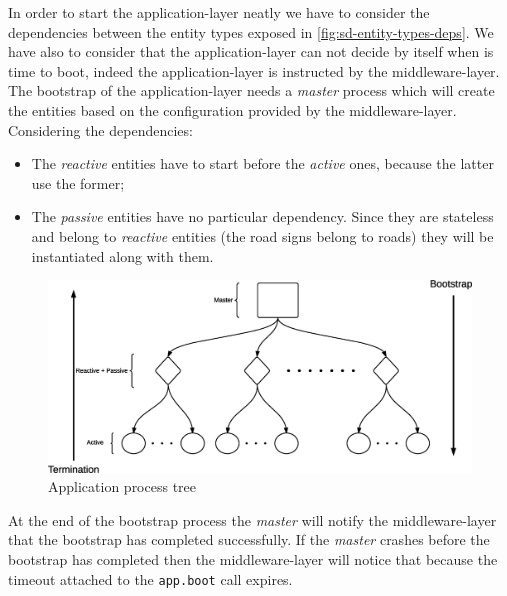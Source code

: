In order to start the application-layer neatly we have to consider the 
dependencies between the entity types exposed in \ref{fig:sd-entity-types-deps}. 
We have also to consider that the application-layer can not decide by itself 
when is time to boot, indeed the application-layer is instructed by the 
middleware-layer. The bootstrap of the application-layer needs a \textit{master} 
process which will create the entities based on the configuration provided by 
the middleware-layer. Considering the dependencies:
\begin{itemize}
  \item The \textit{reactive} entities have to start before the \textit{active} 
ones, because the latter use the former; 
  \item The \textit{passive} entities have no particular dependency. Since 
they are stateless and belong to \textit{reactive} entities (the road signs 
belong to roads) they will be instantiated along with them.
\end{itemize}

\begin{figure}[H]
  \centering
  \includegraphics[width=\columnwidth]{sections/images/solution/app_proc_tree.eps}
  \caption{Application process tree}
  \label{fig:app-proc-tree}
\end{figure}

At the end of the bootstrap process the \textit{master} will notify the 
middleware-layer that the bootstrap has completed successfully. If the 
\textit{master} crashes before the bootstrap has completed then 
the middleware-layer will notice that because the timeout 
attached to the \texttt{app.boot} call expires. 


